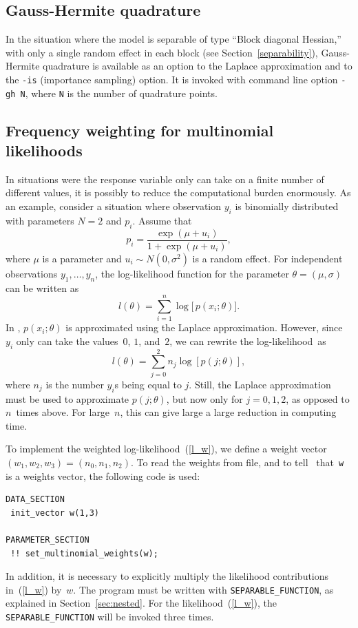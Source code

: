 \documentclass{admbmanual}
\begin{document}
\subsection{Gauss-Hermite quadrature}

In the situation where the model is separable of type ``Block diagonal Hessian,'' with only a single
random effect in each block (see Section~\ref{separability}), Gauss-Hermite quadrature
is available as an option to the Laplace approximation and to the \texttt{-is} (importance sampling) option.
It is invoked with command line option \texttt{-gh N}, where \texttt{N} is the number of quadrature points.


\subsection{Frequency weighting for multinomial likelihoods}

In situations were the response variable only can take on a finite
number of different values, it is possibly to reduce the computational burden
enormously. As an example, consider a situation where observation $y_{i}$ 
is binomially distributed with parameters $N=2$ and $p_{i}$. Assume that
\begin{equation*}
  p_{i}=\frac{\exp (\mu +u_{i})}{1+\exp (\mu +u_{i})},
\end{equation*}
where $\mu$ is a parameter and $u_{i}\sim N(0,\sigma ^{2})$ is a random
effect. For independent observations $y_1,\ldots,y_n$, 
the log-likelihood function for the parameter 
$\theta =(\mu ,\sigma )$ can be written as
\begin{equation}
  l(\theta )=\sum_{i=1}^{n}\log \bigl[\, p(x_{i};\theta )\bigr] .
\end{equation}
In \scAR, $p(x_{i};\theta)$ is approximated using the Laplace approximation. 
However, since $y_i$ only can take the values~$0$, $1$, and~$2$, we can 
rewrite the log-likelihood~as 
$$
l(\theta )=\sum_{j=0}^{2}n_{j}\log \left[ p(j;\theta )\right],  
$$
where $n_j$ is the number $y_i$s being equal to $j$. Still, the Laplace
approximation must be used to approximate $p(j;\theta )$, but now only for
 $j=0,1,2$, as opposed to $n$~times above. For large~$n$, this can give large
a large reduction in computing time.

To implement the weighted log-likelihood~(\ref{l_w}), we define a weight 
vector $(w_1,w_2,w_3)=(n_{0},n_{1},n_{2})$. To read the weights from file, 
and to tell \scAR\ that~\texttt{w} is a weights vector, the following code is used:
\begin{lstlisting}
DATA_SECTION
 init_vector w(1,3)		

PARAMETER_SECTION
 !! set_multinomial_weights(w);
\end{lstlisting}
In addition, it is necessary to explicitly multiply the likelihood contributions
in~(\ref{l_w}) by~$w$. The program must be written with \texttt{SEPARABLE\_FUNCTION}, as 
explained in Section~\ref{sec:nested}. For the likelihood~(\ref{l_w}),
the \texttt{SEPARABLE\_FUNCTION} will be invoked three times.
\end{document}

